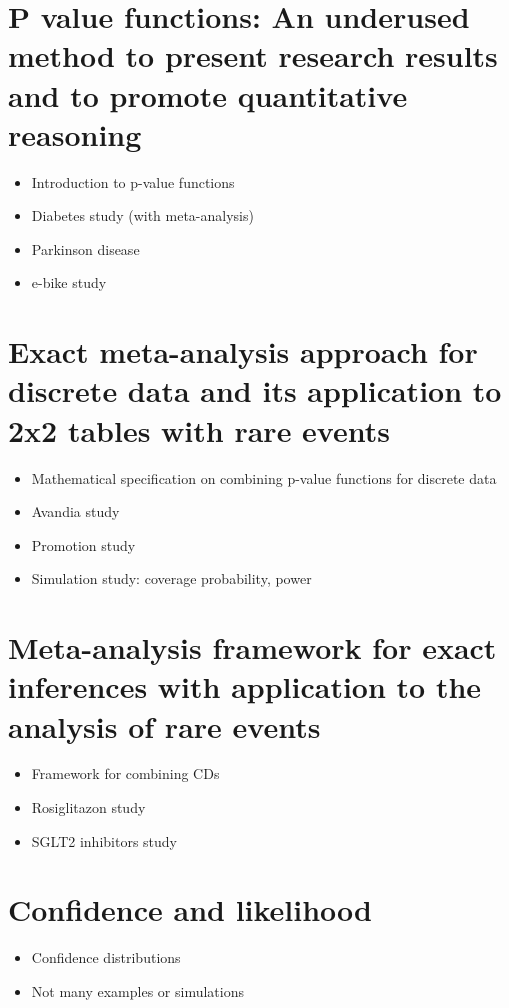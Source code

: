 \documentclass{article}
\begin{document}
\section{P value functions: An underused method to present research results and to promote quantitative reasoning}
\begin{itemize}
  \item Introduction to p-value functions
  \item Diabetes study (with meta-analysis)
  \item Parkinson disease
  \item e-bike study
\end{itemize}

\section{Exact meta-analysis approach for discrete data and its application to 2x2 tables with rare events}
\begin{itemize}
  \item Mathematical specification on combining p-value functions for discrete data
  \item Avandia study
  \item Promotion study
  \item Simulation study: coverage probability, power
\end{itemize}

\section{Meta-analysis framework for exact inferences with application to the analysis of rare events}
\begin{itemize}
  \item Framework for combining CDs
  \item Rosiglitazon study
  \item SGLT2 inhibitors study
\end{itemize}

\section{Confidence and likelihood}
\begin{itemize}
  \item Confidence distributions
  \item Not many examples or simulations
\end{itemize}
\end{document}
